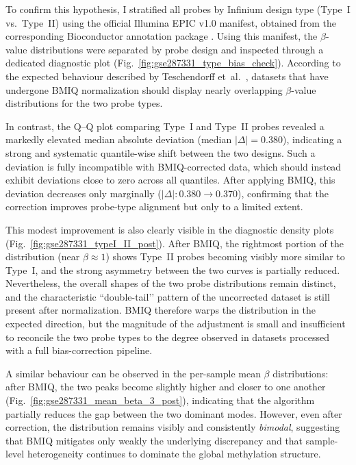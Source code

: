 \documentclass[10pt]{extarticle}
\begin{document}
To confirm this hypothesis, I stratified all probes by Infinium design type (Type~I vs.~Type~II) 
using the official Illumina EPIC v1.0 manifest, obtained from the corresponding Bioconductor 
annotation package \cite{Illumina450kAnno}. Using this manifest, the $\beta$-value distributions 
were separated by probe design and inspected through a dedicated diagnostic plot 
(Fig.~\ref{fig:gse287331_type_bias_check}). According to the expected behaviour described by 
Teschendorff et~al.~\cite{Teschendorff2013BMIQ}, datasets that have undergone BMIQ
normalization should display nearly overlapping $\beta$-value distributions for the two probe types.

In contrast, the Q--Q plot comparing Type~I and Type~II probes revealed a markedly elevated 
median absolute deviation (median $|\Delta| = 0.380$), indicating a strong and systematic 
quantile-wise shift between the two designs. Such a deviation is fully incompatible with 
BMIQ-corrected data, which should instead exhibit deviations close to zero across all quantiles.  
After applying BMIQ, this deviation decreases only marginally ($|\Delta| : 0.380 \rightarrow 0.370$), 
confirming that the correction improves probe-type alignment but only to a limited extent.

This modest improvement is also clearly visible in the diagnostic density plots 
(Fig.~\ref{fig:gse287331_typeI_II_post}). After BMIQ, the rightmost portion of the distribution 
(near $\beta \approx 1$) shows Type~II probes becoming visibly more similar to Type~I, and the 
strong asymmetry between the two curves is partially reduced. Nevertheless, the overall shapes 
of the two probe distributions remain distinct, and the characteristic ``double-tail’’ pattern 
of the uncorrected dataset is still present after normalization. BMIQ therefore warps the 
distribution in the expected direction, but the magnitude of the adjustment is small and 
insufficient to reconcile the two probe types to the degree observed in datasets processed with 
a full bias-correction pipeline.

A similar behaviour can be observed in the per-sample mean $\beta$ distributions: after BMIQ, the 
two peaks become slightly higher and closer to one another 
(Fig.~\ref{fig:gse287331_mean_beta_3_post}), indicating that the algorithm partially reduces the 
gap between the two dominant modes. However, even after correction, the distribution remains 
visibly and consistently \emph{bimodal}, suggesting that BMIQ mitigates only weakly the underlying 
discrepancy and that sample-level heterogeneity continues to dominate the global methylation 
structure.
\end{document}

